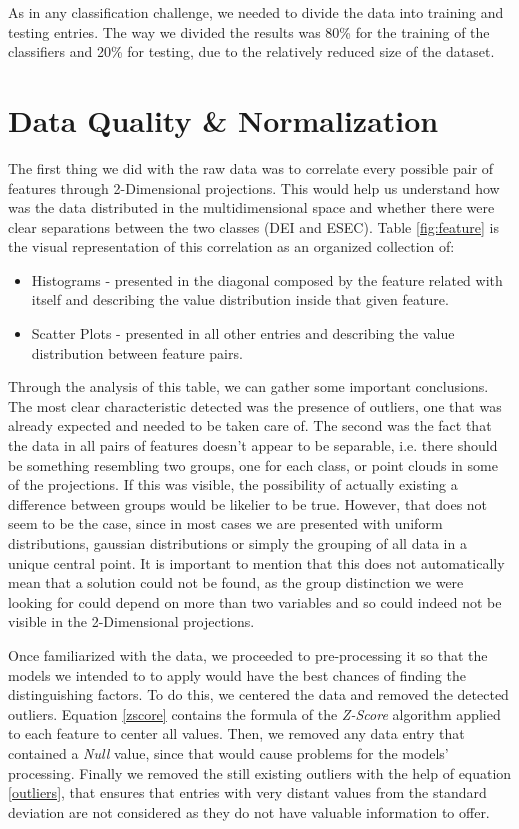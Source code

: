 \documentclass[conference]{IEEEtran}
\begin{document}
As in any classification challenge, we needed to divide the data into training 
and testing entries.
The way we divided the results was 80\% for the training of the classifiers and 
20\% for testing, due to the relatively reduced size of the dataset.

\section{Data Quality \& Normalization}

The first thing we did with the raw data was to correlate every possible pair 
of features through 2-Dimensional projections.
This would help us understand how was the data distributed in the multidimensional
space and whether there were clear separations between the two classes (DEI and
ESEC).
Table \ref{fig:feature} is the visual representation of this correlation as an 
organized collection of:
\begin{itemize}
\item Histograms - presented in the diagonal composed by the feature related with 
itself and describing the value distribution inside that given feature.
\item Scatter Plots - presented in all other entries and describing the value 
distribution between feature pairs.
\end{itemize}
\vspace{2pt}

Through the analysis of this table, we can gather some important conclusions. 
The most clear characteristic detected was the presence of outliers, one that 
was already expected and needed to be taken care of.
The second was the fact that the data in all pairs of features doesn't appear to 
be separable, i.e. there should be something resembling two groups, one for 
each class, or point clouds in some of the projections.
If this was visible, the possibility of actually existing a difference between 
groups would be likelier to be true.
However, that does not seem to be the case, since in most cases we are presented 
with uniform distributions, gaussian distributions or simply the grouping of all 
data in a unique central point. 
It is important to mention that this does not automatically mean that a solution
could not be found, as the group distinction we were looking for could depend on 
more than two variables and so could indeed not be visible in the 2-Dimensional 
projections.

Once familiarized with the data, we proceeded to pre-processing it so that the 
models we intended to to apply would have the best chances of finding the 
distinguishing factors.
To do this, we centered the data and removed the detected outliers.
Equation \ref{zscore} contains the formula of the \textit{Z-Score} algorithm 
applied to each feature to center all values.
Then, we removed any data entry that contained a \textit{Null} value, since that 
would cause problems for the models' processing.
Finally we removed the still existing outliers with the help of equation 
\ref{outliers}, that ensures that entries with very distant values from the 
standard deviation are not considered as they do not have valuable information
to offer.
\end{document}
